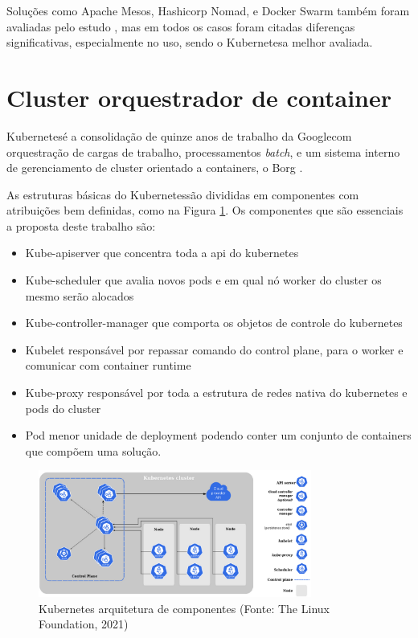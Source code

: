 Soluções como Apache Mesos, Hashicorp Nomad, e Docker Swarm também foram avaliadas pelo estudo \cite{truyen_comprehensive_2021}, mas em todos os casos foram citadas diferenças significativas, especialmente no uso, sendo o Kubernetes\textregistered a melhor avaliada. 

\section{Cluster orquestrador de container}

Kubernetes\textregistered é a consolidação de quinze anos de trabalho da Google\textregistered com orquestração de cargas de trabalho, processamentos \emph{batch}, e um sistema interno de gerenciamento de cluster orientado a containers, o Borg \cite{verma_large-scale_2015}. 

As estruturas básicas do Kubernetes\textregistered são divididas em componentes com atribuições bem definidas, como na Figura \ref{fig:kubenode}. Os componentes que são essenciais a proposta deste trabalho são:
\begin{itemize}
    \item Kube-apiserver que concentra toda a api do kubernetes
    \item Kube-scheduler que avalia novos pods e em qual nó worker do cluster os mesmo serão alocados
    \item Kube-controller-manager que comporta os objetos de controle do kubernetes
    \item Kubelet responsável por repassar comando do control plane, para o worker e comunicar com container runtime
    \item Kube-proxy responsável por toda a estrutura de redes nativa do kubernetes e pods do cluster
    \item Pod menor unidade de deployment podendo conter um conjunto de containers que compõem uma solução.
\end{itemize}

\begin{figure}[!h]
    \centering
    \includegraphics[width=0.8\textwidth]{04-figuras/kubeadm-node.png}
    \caption{Kubernetes arquitetura de componentes (Fonte: The Linux Foundation\textregistered, 2021)}
    \label{fig:kubenode}
\end{figure}




